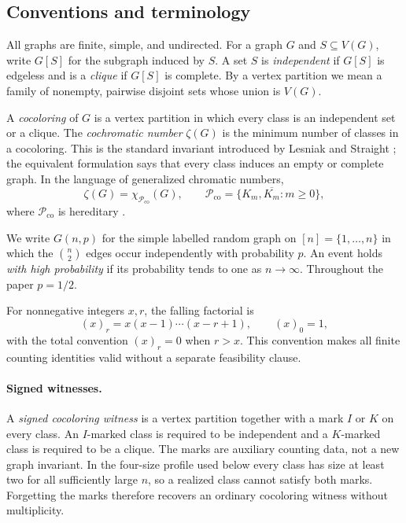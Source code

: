 
\subsection*{Conventions and terminology}

All graphs are finite, simple, and undirected. For a graph \(G\) and
\(S\subseteq V(G)\), write \(G[S]\) for the subgraph induced by \(S\). A set
\(S\) is \emph{independent} if \(G[S]\) is edgeless and is a \emph{clique} if
\(G[S]\) is complete. By a vertex partition we mean a family of nonempty,
pairwise disjoint sets whose union is \(V(G)\).

A \emph{cocoloring} of \(G\) is a vertex partition in which every class is an
independent set or a clique. The \emph{cochromatic number} \(\zeta(G)\) is the
minimum number of classes in a cocoloring. This is the standard invariant
introduced by Lesniak and Straight \citep{lesniak-straight-1977}; the equivalent
formulation says that every class induces an empty or complete graph. In the
language of generalized chromatic numbers,
\[
  \zeta(G)=\chi_{\mathcal P_{\mathrm{co}}}(G),
  \qquad
  \mathcal P_{\mathrm{co}}=\{K_m,\overline{K_m}:m\ge0\},
\]
where \(\mathcal P_{\mathrm{co}}\) is hereditary
\citep{scheinerman-1992,bollobas-thomason-1995}.

We write \(G(n,p)\) for the simple labelled random graph on
\([n]=\{1,\ldots,n\}\) in which the \(\binom n2\) edges occur independently
with probability \(p\). An event holds \emph{with high probability} if its
probability tends to one as \(n\to\infty\). Throughout the paper \(p=1/2\).

For nonnegative integers \(x,r\), the falling factorial is
\[
  (x)_r=x(x-1)\cdots(x-r+1),
  \qquad (x)_0=1,
\]
with the total convention \((x)_r=0\) when \(r>x\). This convention makes all
finite counting identities valid without a separate feasibility clause.

\paragraph{Signed witnesses.}
A \emph{signed cocoloring witness} is a vertex partition together with a mark
\(I\) or \(K\) on every class. An \(I\)-marked class is required to be
independent and a \(K\)-marked class is required to be a clique. The marks are
auxiliary counting data, not a new graph invariant. In the four-size profile
used below every class has size at least two for all sufficiently large \(n\),
so a realized class cannot satisfy both marks. Forgetting the marks therefore
recovers an ordinary cocoloring witness without multiplicity.

